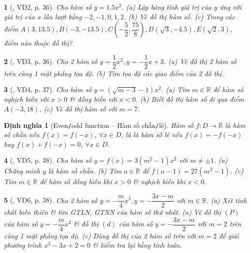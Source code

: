 \documentclass{article}
\newtheorem{baitoan}{}
\newtheorem{dinhnghia}{Định nghĩa}
\begin{document}
\begin{baitoan}[\cite{Binh_boi_duong_Toan_9_tap_2}, VD2, p. 36]
	Cho hàm số $y = 1.5x^2$. (a) Lập bảng tính giá trị của $y$ ứng với giá trị của $x$ lần lượt bằng $-2,-1,0,1,2$. (b) Vẽ đồ thị hàm số. (c) Trong các điểm $A(3,13.5),B(-3,-13.5),C\left(-\dfrac{5}{2},\dfrac{75}{8}\right),D(\sqrt{3},-4.5),E(\sqrt{2},3)$, điểm nào thuộc đồ thị?
\end{baitoan}

\begin{baitoan}[\cite{Binh_boi_duong_Toan_9_tap_2}, VD3, p. 36]
	Cho 2 hàm số $y = \dfrac{1}{2}x^2,y = -\dfrac{1}{2}x + 3$. (a) Vẽ đồ thị 2 hàm số trên cùng 1 mặt phẳng tọa độ. (b) Tìm tọa độ các giao điểm của 2 đồ thị.
\end{baitoan}

\begin{baitoan}[\cite{Binh_boi_duong_Toan_9_tap_2}, VD4, p. 37]
	Cho hàm số $y = (\sqrt{m - 3} - 1)x^2$. (a) Tìm $m\in\mathbb{R}$ để hàm số nghịch biến với $x > 0$ \& đồng biến với $x < 0$. (b) Biết đồ thị hàm số đi qua điểm $A(-3,18)$. (c) Vẽ đồ thị hàm số với $m = 7$.
\end{baitoan}

\begin{dinhnghia}[Even{\tt/}odd function -- Hàm số chẵn{\tt/}lẻ]
	Hàm số $f:D\to\mathbb{R}$ là {\rm hàm số chẵn} nếu $f(x) = f(-x)$, $\forall x\in D$, là là {\rm hàm số lẻ} nếu $f(x) = -f(-x)$ hay $f(x) + f(-x) = 0$, $\forall x\in D$.
\end{dinhnghia}

\begin{baitoan}[\cite{Binh_boi_duong_Toan_9_tap_2}, VD5, p. 38]
	Cho hàm số $y = f(x) = 3(m^2 - 1)x^2$ với $m\ne\pm1$. (a) Chứng minh $y$ là hàm số chẵn. (b) Tìm $a\in\mathbb{R}$ để $f(a - 1) = 27(m^2 - 1)$. (c) Tìm $m\in\mathbb{R}$ để hàm số đồng biến khi $x > 0$ \& nghịch biến khi $x < 0$.
\end{baitoan}

\begin{baitoan}[\cite{Binh_boi_duong_Toan_9_tap_2}, VD6, p. 38]
	Cho 2 hàm số $y = -\dfrac{m}{4}x^2,y = -\dfrac{3x - m}{2}$ với $m\in\mathbb{R}$. (a) Xét tính chất biến thiên \& tìm {\rm GTLN, GTNN} của hàm số thứ nhất. (a) Vẽ đồ thị $(P)$ của hàm số $y = -\dfrac{m}{4}x^2$ \& đồ thị $(d)$ của hàm số $y = -\dfrac{3x - m}{2}$ với $m = 2$ trên cùng 1 mặt phẳng tọa độ. (c) Dùng đồ thị của 2 hàm số trên với $m = 2$ để giải phương trình $x^2 - 3x + 2 = 0$ \& kiểm tra lại bằng tính toán.
\end{baitoan}
\end{document}
